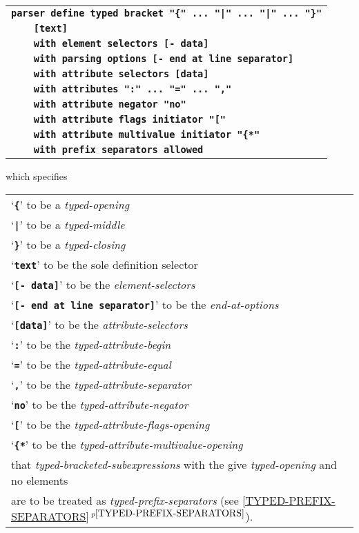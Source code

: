 \documentclass[12pt]{article}
\newcommand{\TT}[1]{{\tt \bfseries #1}}
\newcommand{\itemref}[1]{\ref{#1}$\,^{p\pageref{#1}}$}
\begin{document}
\begin{center}
\begin{tabular}{l}
\TT{parser define typed bracket "\{"~...~"|"~...~"|"~...~"\}"} \\
\TT{~~~~[text]~} \\
\TT{~~~~with element selectors [- data]} \\
\TT{~~~~with parsing options [- end at line separator]} \\
\TT{~~~~with attribute selectors [data]} \\
\TT{~~~~with attributes ":"~...~"="~...~","} \\
\TT{~~~~with attribute negator "no"} \\
\TT{~~~~with attribute flags initiator "["} \\
\TT{~~~~with attribute multivalue initiator "\{*"} \\
\TT{~~~~with prefix separators allowed} \\
\end{tabular}
\end{center}
which specifies
\begin{center}
\begin{tabular}{l}
`\TT{\{}' to be a {\em typed-opening} \\
`\TT{|}' to be a {\em typed-middle} \\
`\TT{\}}' to be a {\em typed-closing} \\
`\TT{text}' to be the sole definition selector \\
`\TT{[- data]}' to be the {\em element-selectors} \\
`\TT{[- end at line separator]}' to be the {\em end-at-options} \\
`\TT{[data]}' to be the {\em attribute-selectors} \\
`\TT{:}' to be the {\em typed-attribute-begin} \\
`\TT{=}' to be the {\em typed-attribute-equal} \\
`\TT{,}' to be the {\em typed-attribute-separator} \\
`\TT{no}' to be the {\em typed-attribute-negator} \\
`\TT{[}' to be the {\em typed-attribute-flags-opening} \\
`\TT{\{*}' to be the {\em typed-attribute-multivalue-opening} \\
that {\em typed-bracketed-subexpressions} with the give {\em typed-opening}
and no elements \\
are to be treated as {\em typed-prefix-separators}
(see \itemref{TYPED-PREFIX-SEPARATORS}).
\end{tabular}
\end{center}
\end{document}
